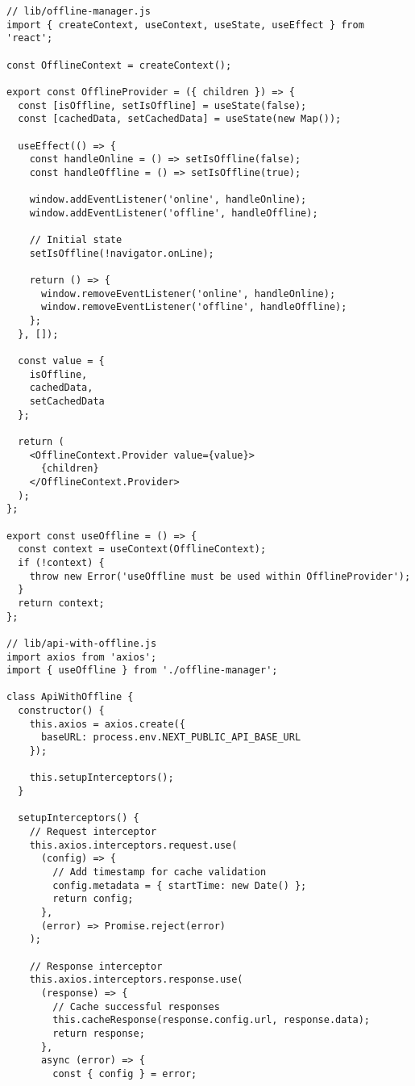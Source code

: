 \begin{lstlisting}[caption={Offline Mode Implementation}, captionpos=b, breaklines=true]
// lib/offline-manager.js
import { createContext, useContext, useState, useEffect } from 'react';

const OfflineContext = createContext();

export const OfflineProvider = ({ children }) => {
  const [isOffline, setIsOffline] = useState(false);
  const [cachedData, setCachedData] = useState(new Map());

  useEffect(() => {
    const handleOnline = () => setIsOffline(false);
    const handleOffline = () => setIsOffline(true);

    window.addEventListener('online', handleOnline);
    window.addEventListener('offline', handleOffline);

    // Initial state
    setIsOffline(!navigator.onLine);

    return () => {
      window.removeEventListener('online', handleOnline);
      window.removeEventListener('offline', handleOffline);
    };
  }, []);

  const value = {
    isOffline,
    cachedData,
    setCachedData
  };

  return (
    <OfflineContext.Provider value={value}>
      {children}
    </OfflineContext.Provider>
  );
};

export const useOffline = () => {
  const context = useContext(OfflineContext);
  if (!context) {
    throw new Error('useOffline must be used within OfflineProvider');
  }
  return context;
};

// lib/api-with-offline.js
import axios from 'axios';
import { useOffline } from './offline-manager';

class ApiWithOffline {
  constructor() {
    this.axios = axios.create({
      baseURL: process.env.NEXT_PUBLIC_API_BASE_URL
    });

    this.setupInterceptors();
  }

  setupInterceptors() {
    // Request interceptor
    this.axios.interceptors.request.use(
      (config) => {
        // Add timestamp for cache validation
        config.metadata = { startTime: new Date() };
        return config;
      },
      (error) => Promise.reject(error)
    );

    // Response interceptor
    this.axios.interceptors.response.use(
      (response) => {
        // Cache successful responses
        this.cacheResponse(response.config.url, response.data);
        return response;
      },
      async (error) => {
        const { config } = error;
        

\end{lstlisting}
